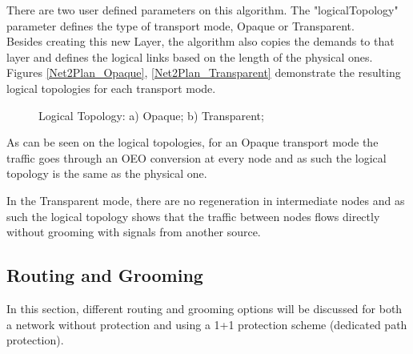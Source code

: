 	There are two user defined parameters on this algorithm. The "logicalTopology" parameter defines the type of transport mode, Opaque or Transparent.\\
	
	
	Besides creating this new Layer, the algorithm also copies the demands to that layer and defines the logical links based on the length of the physical ones.
	Figures \ref{Net2Plan_Opaque}, \ref{Net2Plan_Transparent}  demonstrate the resulting logical topologies for each transport mode.
	
			\begin{figure}[!h]
				\centering
				
				\caption{Logical Topology: a) Opaque; b) Transparent;}								
			\end{figure}	

	As can be seen on the logical topologies, for an Opaque transport mode the traffic goes through an OEO conversion at every node and as such the logical topology is the same as the physical one.
	
	In the Transparent mode, there are no regeneration in intermediate nodes and as such the logical topology shows that the traffic between nodes flows directly without grooming with signals from another source.
	
	\pagebreak
	\subsection{Routing and Grooming} \label{Routing and Grooming}
	
	\vspace{1cm}
	In this section, different routing and grooming options will be discussed for both a network without protection and using a 1+1 protection scheme (dedicated path protection).
		
